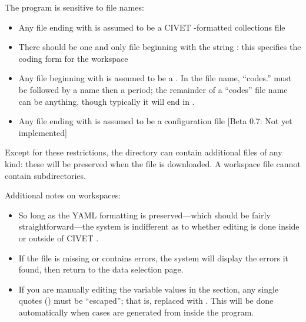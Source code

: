 \documentclass[letterpaper,10pt,english]{sphinxmanual}
\begin{document}
The program is sensitive to file names:
\begin{itemize}
\item {} 
Any file ending with  is assumed to be a CIVET -formatted
collections file

\item {} 
There should be one and only file beginning with the string
: this specifies the coding form for the workspace

\item {} 
Any file beginning with  is assumed to be a
{\hyperref[workspaces:sec-categories]{\emph{}}}. In the file name,
``codes.'' must be followed by a
 name then a period; the remainder of a ``codes'' file
name can be anything, though typically it will end in .

\item {} 
Any file ending with  is assumed to be a configuration file
{[}Beta 0.7: Not yet implemented{]}

\end{itemize}

Except for these restrictions, the directory can contain additional
files of any kind: these will be preserved when the file is downloaded.
A workspace file cannot contain subdirectories.

Additional notes on workspaces:
\begin{itemize}
\item {} 
So long as the YAML formatting is preserved—which should be fairly
straightforward—the system is indifferent as to whether editing is
done inside or outside of CIVET .

\item {} 
If the  file is missing or contains errors, the system will
display the errors it found, then return to the data selection page.

\item {} 
If you are manually editing the variable values in the 
section, any single quotes () must be “escaped”; that is,
replaced with . This will be done automatically when cases are
generated from inside the program.

\end{itemize}
\end{document}
